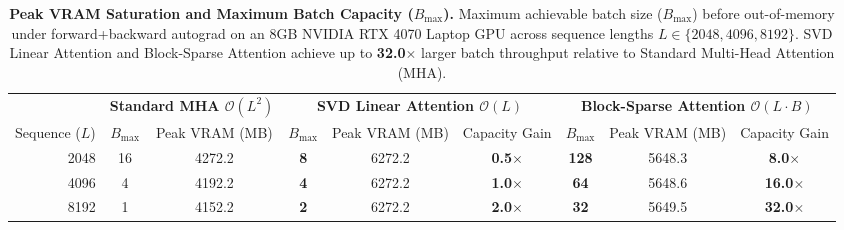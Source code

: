 
\begin{table}[t]
\centering
\small
\caption{\textbf{Peak VRAM Saturation and Maximum Batch Capacity ($B_{\max}$).} Maximum achievable batch size ($B_{\max}$) before out-of-memory under forward+backward autograd on an 8GB NVIDIA RTX 4070 Laptop GPU across sequence lengths $L \in \{2048, 4096, 8192\}$. SVD Linear Attention and Block-Sparse Attention achieve up to \textbf{32.0$\times$} larger batch throughput relative to Standard Multi-Head Attention (MHA).}
\label{tab:peak_batch_saturation}
\begin{tabular}{r | cc | ccc | ccc}
\toprule
& \multicolumn{2}{c|}{\textbf{Standard MHA $\mathcal{O}(L^2)$}} & \multicolumn{3}{c|}{\textbf{SVD Linear Attention $\mathcal{O}(L)$}} & \multicolumn{3}{c}{\textbf{Block-Sparse Attention $\mathcal{O}(L \cdot B)$}} \\
Sequence ($L$) & $B_{\max}$ & Peak VRAM (MB) & $B_{\max}$ & Peak VRAM (MB) & Capacity Gain & $B_{\max}$ & Peak VRAM (MB) & Capacity Gain \\
\midrule
2048 & 16 & 4272.2 & \textbf{8} & 6272.2 & \textbf{0.5$\times$} & \textbf{128} & 5648.3 & \textbf{8.0$\times$} \\
4096 & 4 & 4192.2 & \textbf{4} & 6272.2 & \textbf{1.0$\times$} & \textbf{64} & 5648.6 & \textbf{16.0$\times$} \\
8192 & 1 & 4152.2 & \textbf{2} & 6272.2 & \textbf{2.0$\times$} & \textbf{32} & 5649.5 & \textbf{32.0$\times$} \\
\bottomrule
\end{tabular}
\end{table}
